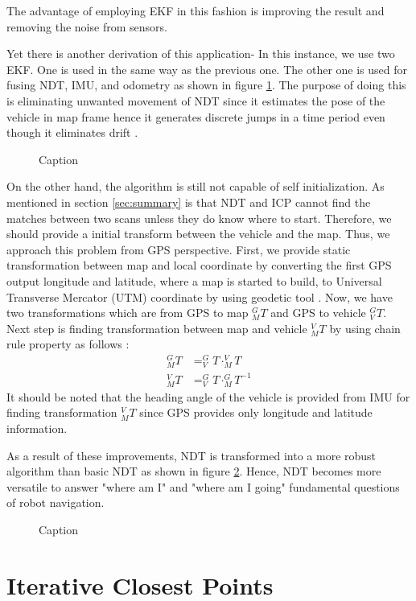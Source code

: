 The advantage of employing EKF in this fashion is improving the result and removing the noise from sensors.
\par Yet there is another derivation of this application- In this instance, we use two EKF. One is used in the same way as the previous one. The other one is used for fusing NDT, IMU, and odometry as shown in figure \ref{fig:ndt_2ekf}. The purpose of doing this is eliminating unwanted movement of NDT since it estimates the pose of the vehicle in map frame hence it generates discrete jumps in a time period even though it eliminates drift \cite{rep105}. 
\begin{figure}[H]
    \centering
    \setlength{\fboxsep}{0pt}%
    \setlength{\fboxrule}{1pt}%
    \caption{Caption}
    \label{fig:ndt_2ekf}
\end{figure}

\par On the other hand, the algorithm is still not capable of self initialization. As mentioned in section \ref{sec:summary} is that NDT and ICP cannot find the matches between two scans unless they do know where to start. Therefore, we should provide a initial transform between the vehicle and the map. Thus, we approach this problem from GPS perspective. First, we provide static transformation between map and local coordinate by converting the first GPS output longitude and latitude, where a map is started to build, to Universal Transverse Mercator (UTM) coordinate by using geodetic tool \cite{utm}. Now, we have two transformations which are from GPS to map $_{M}^{G}T$ and GPS to vehicle $_{V}^{G}T$. Next step is finding transformation between map and vehicle $_{M}^{V}T$ by using chain rule property as follows \cite{robotic}:
\begin{align}
    _{M}^{G}T &= _{V}^{G}T \cdot _{M}^{V}T\\
    _{M}^{V}T &= _{V}^{G}T \cdot _{M}^{G}T^{-1}
\end{align}
It should be noted that the heading angle of the vehicle is provided from IMU for finding transformation  $_{M}^{V}T$ since GPS provides only longitude and latitude information.
\\
\par As a result of these improvements, NDT is transformed into a more robust algorithm than basic NDT as shown in figure \ref{fig:ndt_son}. Hence, NDT becomes more versatile to answer "where am I" and "where am I going" fundamental questions of robot navigation.  
\begin{figure}[H]
    \centering
    \setlength{\fboxsep}{0pt}%
    \setlength{\fboxrule}{1pt}%
    \caption{Caption}
    \label{fig:ndt_son}
\end{figure}
\section{Iterative Closest Points}